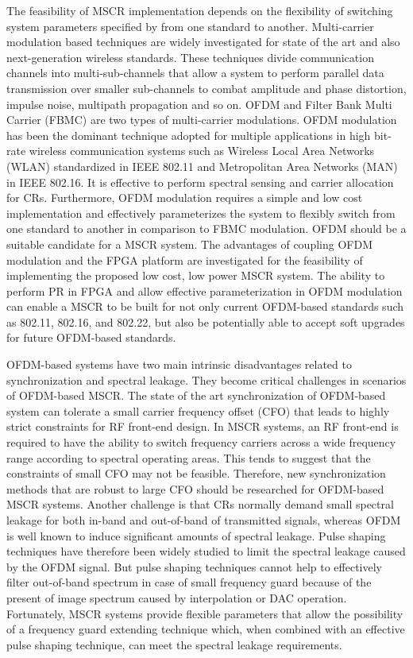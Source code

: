 The feasibility of MSCR implementation depends on the flexibility of switching system parameters specified by from one standard to another. 
Multi-carrier modulation based techniques are widely investigated for state of the art and also next-generation wireless standards. 
These techniques divide communication channels into multi-sub-channels that allow a system to perform parallel data transmission over smaller sub-channels to combat amplitude and phase distortion, impulse noise, multipath propagation and so on. 
OFDM and Filter Bank Multi Carrier (FBMC) are two types of multi-carrier modulations. 
OFDM modulation has been the dominant technique adopted for multiple applications in high bit-rate wireless communication systems such as Wireless Local Area Networks (WLAN) standardized in IEEE 802.11 and Metropolitan Area Networks (MAN) in IEEE 802.16. 
It is effective to perform spectral sensing and carrier allocation for CRs.
Furthermore, OFDM modulation requires a simple and low cost implementation and effectively parameterizes the system to flexibly switch from one standard to another in comparison to FBMC modulation.
OFDM should be a suitable candidate for a MSCR system.
The advantages of coupling OFDM modulation and the FPGA platform are investigated for the feasibility of implementing the proposed low cost, low power MSCR system.
The ability to perform PR in FPGA and allow effective parameterization in OFDM modulation can enable a MSCR to be built for not only current OFDM-based standards such as 802.11, 802.16, and 802.22, but also be potentially able to accept soft upgrades for future OFDM-based standards.

OFDM-based systems have two main intrinsic disadvantages related to synchronization and spectral leakage. They become critical challenges in scenarios of OFDM-based MSCR. 
The state of the art synchronization of OFDM-based system can tolerate a small carrier frequency offset (CFO) that leads to highly strict constraints for RF front-end design. 
In MSCR systems, an RF front-end is required to have the ability to switch frequency carriers across a wide frequency range according to spectral operating areas.  This tends to suggest that the constraints of small CFO may not be feasible. 
Therefore, new synchronization methods that are robust to large CFO should be researched for OFDM-based MSCR systems. 
Another challenge is that CRs normally demand small spectral leakage for both in-band and out-of-band of transmitted signals, whereas OFDM is well known to induce significant amounts of spectral leakage. 
Pulse shaping techniques have therefore been widely studied to limit the spectral leakage caused by the OFDM signal. 
But pulse shaping techniques cannot help to effectively filter out-of-band spectrum in case of small frequency guard because of the present of image spectrum caused by interpolation or DAC operation. 
Fortunately, MSCR systems provide flexible parameters that allow the possibility of a frequency guard extending technique which, when combined with an effective pulse shaping technique, can meet the spectral leakage requirements.

